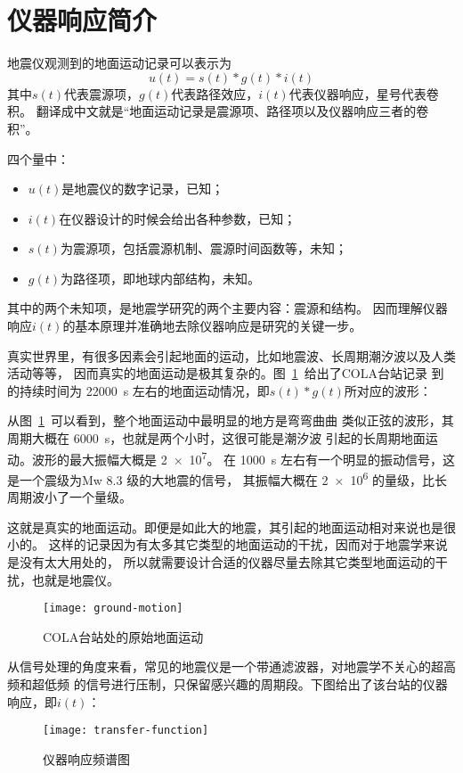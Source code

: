 \section{仪器响应简介}
地震仪观测到的地面运动记录可以表示为
\[  u(t) = s(t) * g(t) * i(t) \]
其中$s(t)$代表震源项，$g(t)$代表路径效应，$i(t)$代表仪器响应，星号代表卷积。
翻译成中文就是``地面运动记录是震源项、路径项以及仪器响应三者的卷积''。

四个量中：
\begin{itemize}
\item $u(t)$是地震仪的数字记录，已知；
\item $i(t)$在仪器设计的时候会给出各种参数，已知；
\item $s(t)$为震源项，包括震源机制、震源时间函数等，未知；
\item $g(t)$为路径项，即地球内部结构，未知。
\end{itemize}
其中的两个未知项，是地震学研究的两个主要内容：震源和结构。
因而理解仪器响应$i(t)$的基本原理并准确地去除仪器响应是研究的关键一步。

真实世界里，有很多因素会引起地面的运动，比如地震波、长周期潮汐波以及人类活动等等，
因而真实的地面运动是极其复杂的。图~\ref{fig:ground-motion}~给出了COLA台站记录
到的持续时间为 \SI{22000}{\s} 左右的地面运动情况，即$s(t)*g(t)$所对应的波形：

从图~\ref{fig:ground-motion}~可以看到，整个地面运动中最明显的地方是弯弯曲曲
类似正弦的波形，其周期大概在 \SI{6000}{\s}，也就是两个小时，这很可能是潮汐波
引起的长周期地面运动。波形的最大振幅大概是 \num{2e7}。
在 \SI{1000}{\s} 左右有一个明显的振动信号，这是一个震级为Mw \num{8.3} 级的大地震的信号，
其振幅大概在 \num{2e6} 的量级，比长周期波小了一个量级。

这就是真实的地面运动。即便是如此大的地震，其引起的地面运动相对来说也是很小的。
这样的记录因为有太多其它类型的地面运动的干扰，因而对于地震学来说是没有太大用处的，
所以就需要设计合适的仪器尽量去除其它类型地面运动的干扰，也就是地震仪。

\begin{figure}[H]
\centering
\texttt{[image: ground-motion]}
\caption{COLA台站处的原始地面运动}
\label{fig:ground-motion}
\end{figure}

从信号处理的角度来看，常见的地震仪是一个带通滤波器，对地震学不关心的超高频和超低频
的信号进行压制，只保留感兴趣的周期段。下图给出了该台站的仪器响应，即$i(t)$：

\begin{figure}[H]
\centering
\texttt{[image: transfer-function]}
\caption{仪器响应频谱图}
\label{fig:transfer-function}
\end{figure}

